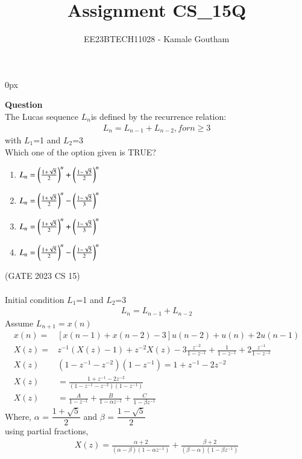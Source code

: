 \documentclass[journal,12pt,twocolumn]{IEEEtran}
\theoremstyle{remark}
\begin{document}
\parindent 0px

\title{Assignment CS\_15Q}
\author{EE23BTECH11028 - Kamale Goutham$^{}$%
}
\maketitle
\newpage
\bigskip
\textbf{Question}\\
The Lucas sequence $L_{n}$is defined by the recurrence relation:\\
\begin{align*}
    L_{n}=L_{n-1}+L_{n-2}, for n\geq3
\end{align*}
with $L_{1}$=1 and $L_{2}$=3\\
Which one of the option given is TRUE?\\
\begin{enumerate}
    \item $L_{n}=\left(\frac{1+\sqrt{5}}{2}\right)^n+\left(\frac{1-\sqrt{5}}{2}\right)^n$
    \item $L_{n}=\left(\frac{1+\sqrt{5}}{2}\right)^n-\left(\frac{1-\sqrt{5}}{3}\right)^n$
    \item $L_{n}=\left(\frac{1+\sqrt{5}}{2}\right)^n+\left(\frac{1-\sqrt{5}}{3}\right)^n$
    \item $L_{n}=\left(\frac{1+\sqrt{5}}{2}\right)^n-\left(\frac{1-\sqrt{5}}{2}\right)^n$
\end{enumerate}
\hfill{(GATE 2023 CS 15)}\\
\solution\\
\fi
Initial condition $L_{1}$=1 and $L_{2}$=3
\begin{align}
 L_{n}=L_{n-1}+L_{n-2}
\end{align}
Assume $L_{n+1}=x(n)$\\
\begin{align}
 x(n)=&[x(n-1)+x(n-2)-3]u(n-2)+u(n)+2u(n-1)\\
 X(z)=&z^{-1}(X(z)-1)+z^{-2}X(z)-3\frac{z^{-2}}{1-z^{-1}}+\frac{1}{1-z^{-1}}+2\frac{z^{-1}}{1-z^{-1}}\\
 X(z)&(1-z^{-1}-z^{-2})(1-z^{-1})=1+z^{-1}-2z^{-2}\\
 X(z)&=\frac{1+z^{-1}-2z^{-2}}{(1-z^{-1}-z^{-2})(1-z^{-1})}\\
 X(z)&=\frac{A}{1-z^{-1}}+\frac{B}{1-\alpha z^{-1}}+\frac{C}{1-\beta z^{-1}}
 \end{align}
 Where, $\alpha$ = $\dfrac{1 +\sqrt{5}}{2}$ and $\beta$ = $\dfrac{1 -\sqrt{5}}{2}$ \\
 
	\vspace{0.4cm}
 using partial fractions,
 \begin{align}
     X(z)=\frac{\alpha+2}{(\alpha-\beta)(1-\alpha z^{-1})}+\frac{\beta+2}{(\beta-\alpha)(1-\beta z^{-1})}
 \end{align}
 
\end{document}
